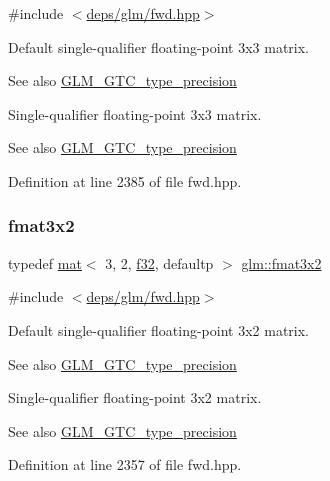 {\ttfamily \#include $<$\hyperlink{fwd_8hpp}{deps/glm/fwd.\+hpp}$>$}

Default single-\/qualifier floating-\/point 3x3 matrix. \begin{DoxySeeAlso}{See also}
\hyperlink{group__gtc__type__precision}{G\+L\+M\+\_\+\+G\+T\+C\+\_\+type\+\_\+precision}
\end{DoxySeeAlso}
Single-\/qualifier floating-\/point 3x3 matrix. \begin{DoxySeeAlso}{See also}
\hyperlink{group__gtc__type__precision}{G\+L\+M\+\_\+\+G\+T\+C\+\_\+type\+\_\+precision} 
\end{DoxySeeAlso}


Definition at line 2385 of file fwd.\+hpp.

\mbox{\label{group__gtc__type__precision_gaed9c8fe9d2e094bf3bc7c606bbae1a6b}} 
\subsubsection{\texorpdfstring{fmat3x2}{fmat3x2}}
{\footnotesize\ttfamily typedef \hyperlink{structglm_1_1mat}{mat}$<$ 3, 2, \hyperlink{group__gtc__type__precision_ga0ec999b57f5330d9021256e96038df04}{f32}, defaultp $>$ \hyperlink{group__gtc__type__precision_gaed9c8fe9d2e094bf3bc7c606bbae1a6b}{glm\+::fmat3x2}}



{\ttfamily \#include $<$\hyperlink{fwd_8hpp}{deps/glm/fwd.\+hpp}$>$}

Default single-\/qualifier floating-\/point 3x2 matrix. \begin{DoxySeeAlso}{See also}
\hyperlink{group__gtc__type__precision}{G\+L\+M\+\_\+\+G\+T\+C\+\_\+type\+\_\+precision}
\end{DoxySeeAlso}
Single-\/qualifier floating-\/point 3x2 matrix. \begin{DoxySeeAlso}{See also}
\hyperlink{group__gtc__type__precision}{G\+L\+M\+\_\+\+G\+T\+C\+\_\+type\+\_\+precision} 
\end{DoxySeeAlso}


Definition at line 2357 of file fwd.\+hpp.

\mbox{\label{group__gtc__type__precision_ga5bf6f06e3cac1ed82489f858a0816aaa}} 
